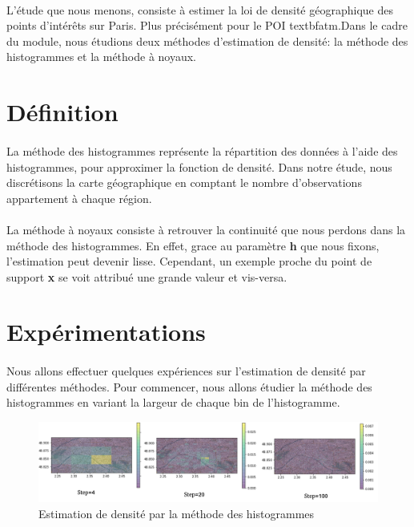 \documentclass{report}
\begin{document}
\paragraph{}
L'étude que nous menons, consiste à estimer la loi de densité géographique des points d'intérêts sur Paris. Plus précisément pour le POI textbf{atm}.Dans le cadre du module, nous étudions deux méthodes d'estimation de densité: la méthode des histogrammes et la méthode à noyaux.

\section{Définition}
\paragraph{}
La méthode des histogrammes représente la répartition des données à l'aide des histogrammes, pour approximer la fonction de densité.
Dans notre étude, nous discrétisons la carte géographique en comptant le nombre d'observations appartement à chaque région. 

\paragraph{}
La méthode à noyaux consiste à retrouver la continuité que nous perdons dans la méthode des histogrammes. En effet, grace au paramètre \textbf{h} que nous fixons, l'estimation peut devenir lisse. Cependant, un exemple proche du point de support \textbf{x} se voit attribué une grande valeur et vis-versa. 
\section{Expérimentations}
\paragraph{}
Nous allons effectuer quelques expériences sur l'estimation de densité par différentes méthodes. Pour commencer, nous allons étudier la méthode des histogrammes en variant la largeur de chaque bin de l'histogramme.

\begin{figure}[H]
	\begin{center}
		\includegraphics[width=1\textwidth]{histo.png}
		\caption{Estimation de densité par la méthode des histogrammes }
	\end{center}
\end{figure}
\end{document}

